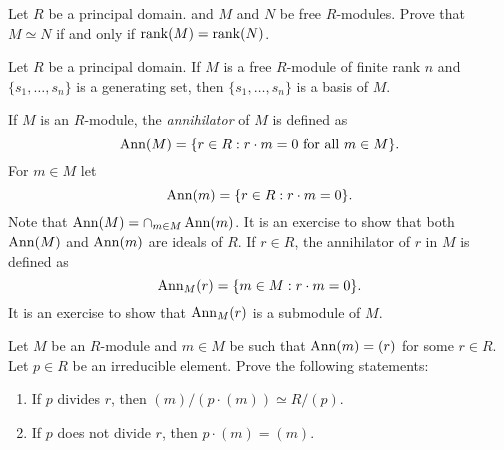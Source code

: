 \begin{exercise}
    Let $R$ be a principal domain. 
    and $M$ and $N$ be free $R$-modules. Prove that 
    $M\simeq N$ if and only if $\operatorname{rank}(M)=\operatorname{rank}(N)$. 	
\end{exercise}

\begin{exercise}
\label{xca:base}
    Let $R$ be a principal domain. 
    If $M$ is a free $R$-module of finite rank $n$ and $\{s_1,\dots,s_n\}$ 
    is a generating set, then $\{s_1,\dots,s_n\}$ is a basis of $M$.
\end{exercise}

If $M$ is an $R$-module, the \emph{annihilator} of $M$ 
is defined as 
\[
\operatorname{Ann}(M)=\{r\in R:r\cdot m=0\text{ for all $m\in M$}\}.
\] 
For $m\in M$ let 
\[
\operatorname{Ann}(m)=\{r\in R:r\cdot m=0\}.
\]  
Note that $\operatorname{Ann}(M)=\cap_{m\in M}\operatorname{Ann}(m)$. 
It is an exercise to show that both 
$\operatorname{Ann}(M)$ and $\operatorname{Ann}(m)$ are ideals of $R$. 
If $r\in R$, the annihilator of $r$ in $M$ 
is defined as 
\[
\operatorname{Ann}_M(r)=\{m\in M:r\cdot m=0\}.
\] 
It is an exercise to show that $\operatorname{Ann}_M(r)$ is a submodule of 
$M$. 

\begin{exercise}
Let $M$ be an $R$-module and $m\in M$ be such that $\operatorname{Ann}(m)=(r)$ 
for some $r\in R$. 
Let $p\in R$ be an irreducible element. Prove the following statements: 
\begin{enumerate}
\item If $p$ divides $r$, then $(m)/(p\cdot (m))\simeq R/(p)$.
\item If $p$ does not divide $r$, then $p\cdot (m)=(m)$.
\end{enumerate}
\end{exercise}



